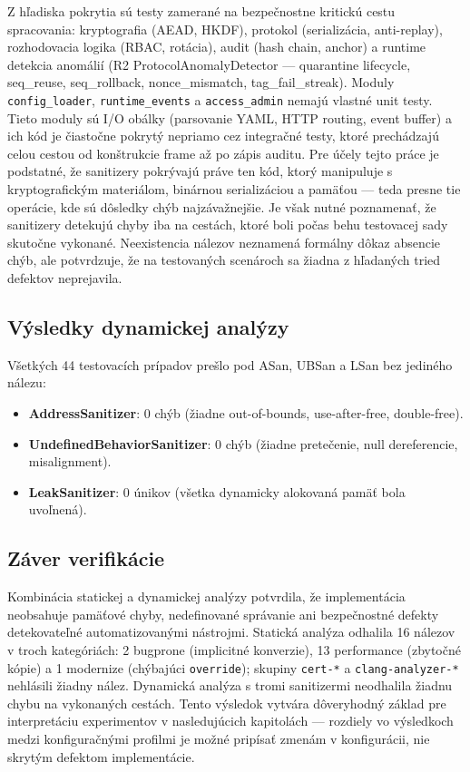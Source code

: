 \documentclass[journal,a4paper,onecolumn]{IEEEtran}
\begin{document}
Z hľadiska pokrytia sú testy zamerané na bezpečnostne kritickú cestu spracovania: kryptografia (AEAD, HKDF), protokol (serializácia, anti-replay), rozhodovacia logika (RBAC, rotácia), audit (hash chain, anchor) a runtime detekcia anomálií (R2 ProtocolAnomalyDetector --- quarantine lifecycle, seq\_reuse, seq\_rollback, nonce\_mismatch, tag\_fail\_streak). Moduly \texttt{config\_loader}, \texttt{runtime\_events} a \texttt{access\_admin} nemajú vlastné unit testy. Tieto moduly sú I/O obálky (parsovanie YAML, HTTP routing, event buffer) a ich kód je čiastočne pokrytý nepriamo cez integračné testy, ktoré prechádzajú celou cestou od konštrukcie frame až po zápis auditu. Pre účely tejto práce je podstatné, že sanitizery pokrývajú práve ten kód, ktorý manipuluje s kryptografickým materiálom, binárnou serializáciou a pamäťou --- teda presne tie operácie, kde sú dôsledky chýb najzávažnejšie. Je však nutné poznamenať, že sanitizery detekujú chyby iba na cestách, ktoré boli počas behu testovacej sady skutočne vykonané. Neexistencia nálezov neznamená formálny dôkaz absencie chýb, ale potvrdzuje, že na testovaných scenároch sa žiadna z hľadaných tried defektov neprejavila.

\subsection{Výsledky dynamickej analýzy}

Všetkých 44 testovacích prípadov prešlo pod ASan, UBSan a LSan bez jediného nálezu:

\begin{itemize}
\item \textbf{AddressSanitizer}: 0 chýb (žiadne out-of-bounds, use-after-free, double-free).
\item \textbf{UndefinedBehaviorSanitizer}: 0 chýb (žiadne pretečenie, null dereferencie, misalignment).
\item \textbf{LeakSanitizer}: 0 únikov (všetka dynamicky alokovaná pamäť bola uvoľnená).
\end{itemize}

\subsection{Záver verifikácie}

Kombinácia statickej a dynamickej analýzy potvrdila, že implementácia neobsahuje pamäťové chyby, nedefinované správanie ani bezpečnostné defekty detekovateľné automatizovanými nástrojmi. Statická analýza odhalila 16 nálezov v troch kategóriách: 2 bugprone (implicitné konverzie), 13 performance (zbytočné kópie) a 1 modernize (chýbajúci \texttt{override}); skupiny \texttt{cert-*} a \texttt{clang-analyzer-*} nehlásili žiadny nález. Dynamická analýza s tromi sanitizermi neodhalila žiadnu chybu na vykonaných cestách. Tento výsledok vytvára dôveryhodný základ pre interpretáciu experimentov v nasledujúcich kapitolách --- rozdiely vo výsledkoch medzi konfiguračnými profilmi je možné pripísať zmenám v konfigurácii, nie skrytým defektom implementácie.
\end{document}

